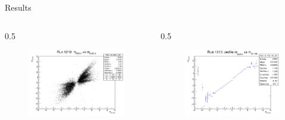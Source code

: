 \documentclass{beamer}[10pt]
\begin{document}
\begin{frame}{Results}
  \vspace{-3mm}
  \begin{columns}
    \begin{column}{0.5\framewidth}
      \begin{figure}[H]
        \centering
        \includegraphics[width= \textwidth]{figures/pdf/myz_vs_myz_rec.png}
        \label{fig:enter-label}
    \end{figure}
    
    \end{column}
    \begin{column}{0.5\framewidth}
     
      \begin{figure}[H]
        \centering
        \includegraphics[width= \textwidth]{figures/pdf/myz_vs_myz_rec_prof.png}
        \label{fig:enter-label}
    \end{figure}
    \end{column}
  \end{columns}
\end{frame}
\end{document}
